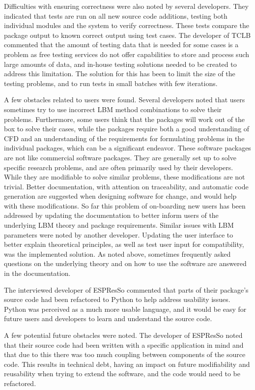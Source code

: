 \documentclass[12pt, notitlepage]{article}
\begin{document}
Difficulties with ensuring correctness were also noted by several developers. They indicated that tests are run on all new source code additions, testing both individual modules and the system to verify correctness. These tests compare the package output to known correct output using test cases. The developer of TCLB commented that the amount of testing data that is needed for some cases is a problem as free testing services do not offer capabilities to store and process such large amounts of data, and in-house testing solutions needed to be created to address this limitation. The solution for this has been to limit the size of the testing problems, and to run tests in small batches with few iterations.

A few obstacles related to users were found. Several developers noted that users sometimes try to use incorrect LBM method combinations to solve their problems. Furthermore, some users think that the packages will work out of the box to solve their cases, while the packages require both a good understanding of CFD and an understanding of the requirements for formulating problems in the individual packages, which can be a significant endeavor. These software packages are not like commercial software packages. They are generally set up to solve specific research problems, and are often primarily used by their developers. While they are modifiable to solve similar problems, these modifications are not trivial. Better documentation, with attention on traceability, and automatic code generation are suggested when designing software for change, and would help with these modifications. So far this problem of on-boarding new users has been addressed by updating the documentation to better inform users of the underlying LBM theory and package requirements. Similar issues with LBM parameters were noted by another developer. Updating the user interface to better explain theoretical principles, as well as test user input for compatibility, was the implemented solution. As noted above, sometimes frequently asked questions on the underlying theory and on how to use the software are answered in the documentation.

The interviewed developer of ESPResSo commented that parts of their package's source code had been refactored to Python to help address usability issues. Python was perceived as a much more usable language, and it would be easy for future users and developers to learn and understand the source code. 

A few potential future obstacles were noted. The developer of ESPResSo noted that their source code had been written with a specific application in mind and that due to this there was too much coupling between components of the source code. This results in technical debt, having an impact on future modifiability and reusability when trying to extend the software, and the code would need to be refactored.
\end{document}
